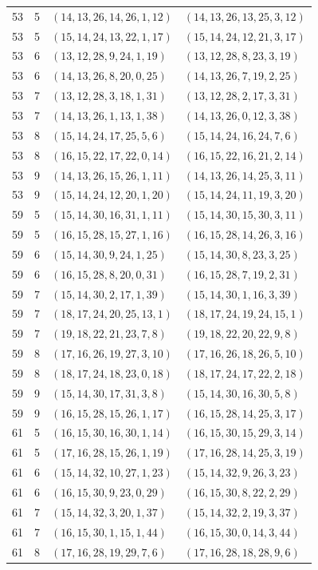 \documentclass[11pt,a4paper,oneside,openany]{book}
\theoremstyle{definition}
\numberwithin{equation}{chapter}
\begin{document}
\begin{longtable}{rrll}
53&5&$(14,13,26,14,26,1,12)$&$(14,13,26,13,25,3,12)$\\
53&5&$(15,14,24,13,22,1,17)$&$(15,14,24,12,21,3,17)$\\
53&6&$(13,12,28,9,24,1,19)$&$(13,12,28,8,23,3,19)$\\
53&6&$(14,13,26,8,20,0,25)$&$(14,13,26,7,19,2,25)$\\
53&7&$(13,12,28,3,18,1,31)$&$(13,12,28,2,17,3,31)$\\
53&7&$(14,13,26,1,13,1,38)$&$(14,13,26,0,12,3,38)$\\
53&8&$(15,14,24,17,25,5,6)$&$(15,14,24,16,24,7,6)$\\
53&8&$(16,15,22,17,22,0,14)$&$(16,15,22,16,21,2,14)$\\
53&9&$(14,13,26,15,26,1,11)$&$(14,13,26,14,25,3,11)$\\
53&9&$(15,14,24,12,20,1,20)$&$(15,14,24,11,19,3,20)$\\
59&5&$(15,14,30,16,31,1,11)$&$(15,14,30,15,30,3,11)$\\
59&5&$(16,15,28,15,27,1,16)$&$(16,15,28,14,26,3,16)$\\
59&6&$(15,14,30,9,24,1,25)$&$(15,14,30,8,23,3,25)$\\
59&6&$(16,15,28,8,20,0,31)$&$(16,15,28,7,19,2,31)$\\
59&7&$(15,14,30,2,17,1,39)$&$(15,14,30,1,16,3,39)$\\
59&7&$(18,17,24,20,25,13,1)$&$(18,17,24,19,24,15,1)$\\
59&7&$(19,18,22,21,23,7,8)$&$(19,18,22,20,22,9,8)$\\
59&8&$(17,16,26,19,27,3,10)$&$(17,16,26,18,26,5,10)$\\
59&8&$(18,17,24,18,23,0,18)$&$(18,17,24,17,22,2,18)$\\
59&9&$(15,14,30,17,31,3,8)$&$(15,14,30,16,30,5,8)$\\
59&9&$(16,15,28,15,26,1,17)$&$(16,15,28,14,25,3,17)$\\
61&5&$(16,15,30,16,30,1,14)$&$(16,15,30,15,29,3,14)$\\
61&5&$(17,16,28,15,26,1,19)$&$(17,16,28,14,25,3,19)$\\
61&6&$(15,14,32,10,27,1,23)$&$(15,14,32,9,26,3,23)$\\
61&6&$(16,15,30,9,23,0,29)$&$(16,15,30,8,22,2,29)$\\
61&7&$(15,14,32,3,20,1,37)$&$(15,14,32,2,19,3,37)$\\
61&7&$(16,15,30,1,15,1,44)$&$(16,15,30,0,14,3,44)$\\
61&8&$(17,16,28,19,29,7,6)$&$(17,16,28,18,28,9,6)$\\

\end{longtable}
\end{document}
